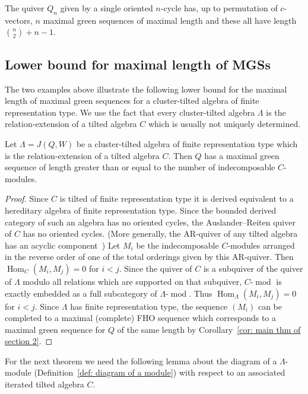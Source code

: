\documentclass[ALCO,ThmDefs,Unicode,epreuves]{cedram}
\DeclareMathOperator{\Hom}{Hom}%
\DeclareMathOperator{\modr}{mod}
\begin{document}
\begin{theo}[\cite{AI}]
The quiver $Q_n$ given by a single oriented $n$-cycle has, up to permutation of $c$-vectors, $n$ maximal green sequences of maximal length and these all have length $\binom n2+n-1$.
\end{theo}

\subsection{Lower bound for maximal length of MGSs}


The two examples above illustrate the following lower bound for the maximal length of maximal green sequences for a cluster-tilted algebra of finite representation type. We use the fact that every cluster-tilted algebra $\Lambda$ is the relation-extension of a tilted algebra $C$ which is usually not uniquely determined.


\begin{lemm}\label{lem: lower bound for MGSs}
Let $\Lambda=J(Q,W)$ be a cluster-tilted algebra of finite representation type which is the relation-extension of a tilted algebra $C$. Then $Q$ has a maximal green sequence of length greater than or equal to the number of indecomposable $C$-modules.
\end{lemm}

\begin{proof}
Since $C$ is tilted of finite representation type it is derived equivalent to a hereditary algebra of finite representation type. Since the bounded derived category of such an algebra has no oriented cycles, the Auslander--Reiten quiver of $C$ has no oriented cycles. (More generally, the AR-quiver of any tilted algebra has an acyclic component~\cite[VIII.3.5.]{ASS}) Let $M_i$ be the indecomposable $C$-modules arranged in the reverse order of one of the total orderings given by this AR-quiver. Then $\Hom_{C}(M_i,M_j)=0$ for $i<j$. Since the quiver of $C$ is a subquiver of the quiver of $\Lambda$ modulo all relations which are supported on that subquiver, $C\text{-}\modr $ is exactly embedded as a full subcategory of $\Lambda\text{-}\modr $. Thus $\Hom_\Lambda(M_i,M_j)=0$ for $i<j$. Since $\Lambda$ has finite representation type, the sequence $(M_i)$ can be completed to a maximal (complete) FHO sequence which corresponds to a maximal green sequence for $Q$ of the same length by Corollary~\ref{cor: main thm of section 2}.
\end{proof}

For the next theorem we need the following lemma about the diagram of a $\Lambda$-module (Definition~\ref{def: diagram of a module}) with respect to an associated iterated tilted algebra $C$.
\end{document}
